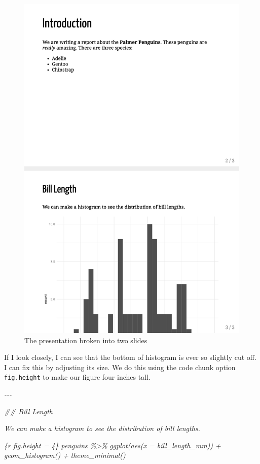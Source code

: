 \documentclass[
]{book}
\newenvironment{Shaded}{\begin{snugshade}}{\end{snugshade}}
\newcommand{\CommentTok}[1]{\textcolor[rgb]{0.56,0.35,0.01}{\textit{#1}}}
\begin{document}
\begin{figure}
\includegraphics[width=1\linewidth]{assets/penguins-report-2-pages} \caption{The presentation broken into two slides}\label{fig:penguins-report-2-pages}
\end{figure}

If I look closely, I can see that the bottom of histogram is ever so slightly cut off. I can fix this by adjusting its size. We do this using the code chunk option \texttt{fig.height} to make our figure four inches tall.

\begin{Shaded}
\begin{Highlighting}[]
\CommentTok{{-}{-}{-}}

\CommentTok{\#\# Bill Length}

\CommentTok{We can make a histogram to see the distribution of bill lengths.}

\CommentTok{\textasciigrave{}\textasciigrave{}\textasciigrave{}\{r fig.height = 4\}}
\CommentTok{penguins \%\textgreater{}\%}
\CommentTok{  ggplot(aes(x = bill\_length\_mm)) +}
\CommentTok{  geom\_histogram() +}
\CommentTok{  theme\_minimal()}
\CommentTok{\textasciigrave{}\textasciigrave{}\textasciigrave{}}
\end{Highlighting}
\end{Shaded}
\end{document}
